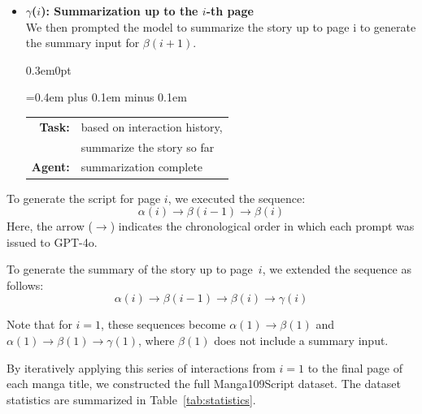 \begin{itemize}
    \item \textbf{$\gamma$($i$): Summarization up to the $i$-th page} \\
    We then prompted the model to summarize the story up to page i to generate the summary input for $\beta(i+1)$.

    \vspace{0.5em}
    \begin{adjustwidth}{0.3em}{0pt}
    \setlength{\tabcolsep}{2pt}
    {\ttfamily\spaceskip=0.4em plus 0.1em minus 0.1em
    \begin{tabular}{@{}r l@{}}
    \textbf{Task:} & based on interaction history, \\
                   & summarize the story so far  \\
    \textbf{Agent:} & summarization complete \\
    \end{tabular}
    }
    \end{adjustwidth}
\end{itemize}
\vspace{0.5em} 

To generate the script for page $i$, we executed the sequence:
\[
\alpha(i) \rightarrow \beta(i{-}1) \rightarrow \beta(i)
\]
Here, the arrow ($\rightarrow$) indicates the chronological order in which each prompt was issued to GPT-4o.

To generate the summary of the story up to page~$i$, we extended the sequence as follows:
\[
\alpha(i) \rightarrow \beta(i{-}1) \rightarrow \beta(i) \rightarrow \gamma(i)
\]

Note that for $i = 1$, these sequences become $\alpha(1) \rightarrow \beta(1)$ and $\alpha(1) \rightarrow \beta(1)\rightarrow \gamma(1)$, where $\beta(1)$ does not include a summary input.

By iteratively applying this series of interactions from $i = 1$ to the final page of each manga title, we constructed the full Manga109Script dataset. The dataset statistics are summarized in Table~\ref{tab:statistics}.

